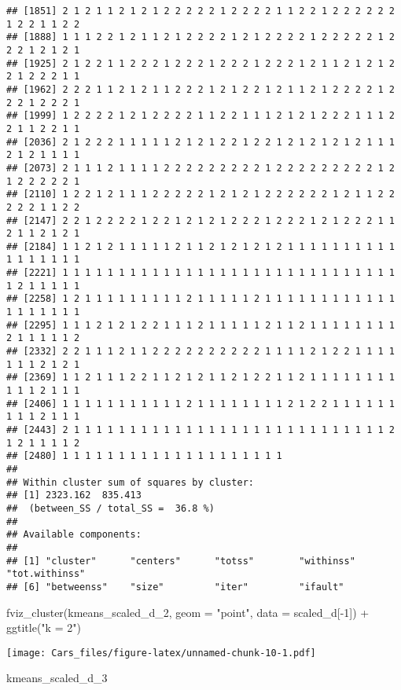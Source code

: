 \documentclass[
]{article}
\newenvironment{Shaded}{\begin{snugshade}}{\end{snugshade}}
\newcommand{\AttributeTok}[1]{\textcolor[rgb]{0.77,0.63,0.00}{#1}}
\newcommand{\DecValTok}[1]{\textcolor[rgb]{0.00,0.00,0.81}{#1}}
\newcommand{\FunctionTok}[1]{\textcolor[rgb]{0.00,0.00,0.00}{#1}}
\newcommand{\NormalTok}[1]{#1}
\newcommand{\SpecialCharTok}[1]{\textcolor[rgb]{0.00,0.00,0.00}{#1}}
\newcommand{\StringTok}[1]{\textcolor[rgb]{0.31,0.60,0.02}{#1}}
\begin{document}
\begin{verbatim}
## [1851] 2 1 2 1 1 2 1 2 1 2 2 2 2 2 1 2 2 2 2 1 1 2 2 1 2 2 2 2 2 2 1 2 2 1 1 2 2
## [1888] 1 1 1 2 2 1 2 1 1 2 1 2 2 2 2 1 2 1 2 2 2 2 1 2 2 2 2 2 1 2 2 2 1 2 1 2 1
## [1925] 2 1 2 2 1 1 2 2 2 1 2 2 2 1 2 2 2 1 2 2 2 1 2 1 1 2 1 2 1 2 2 1 2 2 2 1 1
## [1962] 2 2 2 1 1 2 1 2 1 1 2 2 2 1 2 1 2 2 1 2 1 1 2 1 2 2 2 2 1 2 2 2 1 2 2 2 1
## [1999] 1 2 2 2 2 1 2 1 2 2 2 2 1 1 2 2 1 1 1 2 1 2 1 2 2 2 1 1 1 2 2 1 1 2 2 1 1
## [2036] 2 1 2 2 2 1 1 1 1 1 2 1 2 1 2 2 1 2 2 1 2 1 2 1 2 1 2 1 1 1 2 1 2 1 1 1 1
## [2073] 2 1 1 1 2 1 1 1 1 2 2 2 2 2 2 2 2 2 1 2 2 2 2 2 2 2 2 2 1 2 1 2 2 2 2 2 1
## [2110] 1 2 2 1 2 1 1 1 2 2 2 2 2 1 2 1 2 1 2 2 2 2 2 2 1 2 1 1 2 2 2 2 2 1 1 2 2
## [2147] 2 2 1 2 2 2 2 1 2 2 1 2 1 2 1 2 2 2 1 2 2 2 1 2 1 2 2 2 1 1 2 1 1 2 1 2 1
## [2184] 1 1 2 1 2 1 1 1 1 1 2 1 1 2 1 2 1 2 1 2 1 1 1 1 1 1 1 1 1 1 1 1 1 1 1 1 1
## [2221] 1 1 1 1 1 1 1 1 1 1 1 1 1 1 1 1 1 1 1 1 1 1 1 1 1 1 1 1 1 1 1 2 1 1 1 1 1
## [2258] 1 2 1 1 1 1 1 1 1 1 1 2 1 1 1 1 1 2 1 1 1 1 1 1 1 1 1 1 1 1 1 1 1 1 1 1 1
## [2295] 1 1 1 2 1 2 1 2 2 1 1 1 2 1 1 1 1 1 2 1 1 2 1 1 1 1 1 1 1 1 2 1 1 1 1 1 2
## [2332] 2 2 1 1 1 2 1 1 2 2 2 2 2 2 2 2 2 2 1 1 1 1 2 1 2 2 1 1 1 1 1 1 1 2 1 2 1
## [2369] 1 1 2 1 1 1 2 2 1 1 2 1 2 1 1 2 1 2 2 1 1 2 1 1 1 1 1 1 1 1 1 1 1 2 1 1 1
## [2406] 1 1 1 1 1 1 1 1 1 1 1 2 1 1 1 1 1 1 1 1 2 1 2 2 1 1 1 1 1 1 1 1 1 2 1 1 1
## [2443] 2 1 1 1 1 1 1 1 1 1 1 1 1 1 1 1 1 1 1 1 1 1 1 1 1 1 1 1 1 2 1 2 1 1 1 1 2
## [2480] 1 1 1 1 1 1 1 1 1 1 1 1 1 1 1 1 1 1 1 1
## 
## Within cluster sum of squares by cluster:
## [1] 2323.162  835.413
##  (between_SS / total_SS =  36.8 %)
## 
## Available components:
## 
## [1] "cluster"      "centers"      "totss"        "withinss"     "tot.withinss"
## [6] "betweenss"    "size"         "iter"         "ifault"
\end{verbatim}

\begin{Shaded}
\begin{Highlighting}[]
\FunctionTok{fviz\_cluster}\NormalTok{(kmeans\_scaled\_d\_2, }\AttributeTok{geom =} \StringTok{"point"}\NormalTok{, }\AttributeTok{data =}\NormalTok{ scaled\_d[}\SpecialCharTok{{-}}\DecValTok{1}\NormalTok{]) }\SpecialCharTok{+} \FunctionTok{ggtitle}\NormalTok{(}\StringTok{"k = 2"}\NormalTok{)}
\end{Highlighting}
\end{Shaded}

\texttt{[image: Cars\_files/figure-latex/unnamed-chunk-10-1.pdf]}

\begin{Shaded}
\begin{Highlighting}[]
\NormalTok{kmeans\_scaled\_d\_3}
\end{Highlighting}
\end{Shaded}
\end{document}
